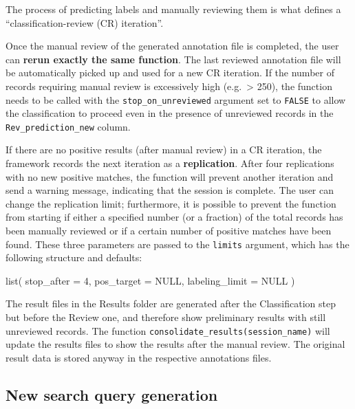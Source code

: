 \documentclass[
]{article}
\newenvironment{Shaded}{\begin{snugshade}}{\end{snugshade}}
\newcommand{\AttributeTok}[1]{\textcolor[rgb]{0.77,0.63,0.00}{#1}}
\newcommand{\ConstantTok}[1]{\textcolor[rgb]{0.00,0.00,0.00}{#1}}
\newcommand{\DecValTok}[1]{\textcolor[rgb]{0.00,0.00,0.81}{#1}}
\newcommand{\FunctionTok}[1]{\textcolor[rgb]{0.00,0.00,0.00}{#1}}
\newcommand{\NormalTok}[1]{#1}
\begin{document}
The process of predicting labels and manually reviewing them is what
defines a ``classification-review (CR) iteration''.

Once the manual review of the generated annotation file is completed,
the user can \textbf{rerun exactly the same function}. The last reviewed
annotation file will be automatically picked up and used for a new CR
iteration. If the number of records requiring manual review is
excessively high (e.g.~\textgreater{} 250), the function needs to be
called with the \texttt{stop\_on\_unreviewed} argument set to
\texttt{FALSE} to allow the classification to proceed even in the
presence of unreviewed records in the \texttt{Rev\_prediction\_new}
column.

If there are no positive results (after manual review) in a CR
iteration, the framework records the next iteration as a
\textbf{replication}. After four replications with no new positive
matches, the function will prevent another iteration and send a warning
message, indicating that the session is complete. The user can change
the replication limit; furthermore, it is possible to prevent the
function from starting if either a specified number (or a fraction) of
the total records has been manually reviewed or if a certain number of
positive matches have been found. These three parameters are passed to
the \texttt{limits} argument, which has the following structure and
defaults:

\begin{Shaded}
\begin{Highlighting}[]
\FunctionTok{list}\NormalTok{(}
  \AttributeTok{stop\_after =} \DecValTok{4}\NormalTok{,}
  \AttributeTok{pos\_target =} \ConstantTok{NULL}\NormalTok{,}
  \AttributeTok{labeling\_limit =} \ConstantTok{NULL}
\NormalTok{)}
\end{Highlighting}
\end{Shaded}

The result files in the Results folder are generated after the
Classification step but before the Review one, and therefore show
preliminary results with still unreviewed records. The function
\texttt{consolidate\_results(session\_name)} will update the results
files to show the results after the manual review. The original result
data is stored anyway in the respective annotations files.

\hypertarget{new-search-query-generation}{%
\subsection{New search query
generation}\label{new-search-query-generation}}
\end{document}
